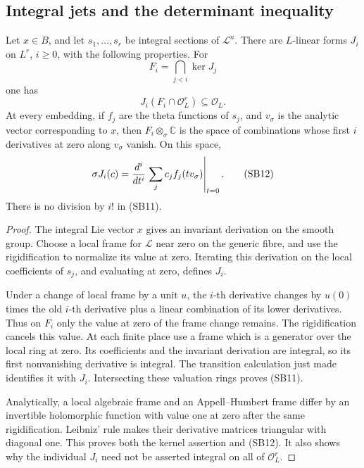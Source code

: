 \subsection{Integral jets and the determinant inequality}

\begin{srlemma}\label{lem:sr-slope-first-jet-integral}
Let \(x\in B\), and let \(s_1,\ldots,s_r\)
be integral sections of \(\mathcal L^n\).
There are \(L\)-linear forms \(J_i\) on
\(L^r\), \(i\ge0\), with the following
properties.
For
\[
                 F_i=\bigcap_{j<i}\ker J_j
\]
one has
\[
       J_i(F_i\cap\mathcal O_L^r)\subseteq\mathcal O_L. \tag{SB11}
\]
At every embedding, if \(f_j\) are the theta
functions of \(s_j\), and \(v_\sigma\)
is the analytic vector corresponding to
\(x\), then \(F_i\otimes_\sigma\mathbb C\)
is the space of combinations whose first
\(i\) derivatives at zero along \(v_\sigma\)
vanish.
On this space,
\[
       \sigma J_i(c)
          ={d^i\over dt^i}
                \left.\sum_j c_j f_j(tv_\sigma)\right|_{t=0}. \tag{SB12}
\]
There is no division by \(i!\) in (SB11).
\end{srlemma}

\begin{proof}
The integral Lie vector \(x\) gives an
invariant derivation on the smooth group.
Choose a local frame for \(\mathcal L\)
near zero on the generic fibre, and use the
rigidification to normalize its value at
zero.
Iterating this derivation on the local
coefficients of \(s_j\), and evaluating at
zero, defines \(J_i\).

Under a change of local frame by a unit
\(u\), the \(i\)-th derivative changes by
\(u(0)\) times the old \(i\)-th derivative
plus a linear combination of its lower
derivatives.
Thus on \(F_i\) only the value at zero of
the frame change remains.
The rigidification cancels this value.
At each finite place use a frame which is
a generator over the local ring at zero.
Its coefficients and the invariant
derivation are integral, so its first
nonvanishing derivative is integral.
The transition calculation just made
identifies it with \(J_i\).
Intersecting these valuation rings proves
(SB11).

Analytically, a local algebraic frame and an
Appell--Humbert frame differ by an invertible
holomorphic function with value one at zero
after the same rigidification.
Leibniz' rule makes their derivative
matrices triangular with diagonal one.
This proves both the kernel assertion and
(SB12).
It also shows why the individual \(J_i\)
need not be asserted integral on all of
\(\mathcal O_L^r\).
\end{proof}

